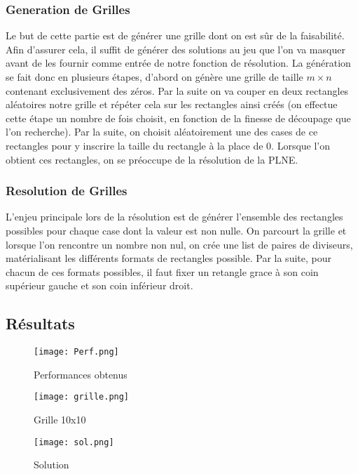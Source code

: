 \documentclass[a4paper,12pt,titlepage,leqno]{article}
\begin{document}
\subsubsection{Generation de Grilles}

Le but de cette partie est de générer une grille dont on est sûr de la faisabilité. Afin d'assurer cela, il suffit de générer des solutions au jeu que l'on va masquer avant de les fournir comme entrée de notre fonction de résolution.
La génération se fait donc en plusieurs étapes, d'abord on génère une grille de taille \( m \times n \) contenant exclusivement des zéros. Par la suite on va couper en deux rectangles aléatoires notre grille et répéter cela sur les rectangles ainsi créés (on effectue cette étape un nombre de fois choisit, en fonction de la finesse de découpage que l'on recherche). Par la suite, on choisit aléatoirement une des cases de ce rectangles pour y inscrire la taille du rectangle à la place de 0.
Lorsque l'on obtient ces rectangles, on se préoccupe de la résolution de la PLNE.

\subsubsection{Resolution de Grilles}

L'enjeu principale lors de la résolution est de générer l'ensemble des rectangles possibles pour chaque case dont la valeur est non nulle. On parcourt la grille et lorsque l'on rencontre un nombre non nul, on crée une list de paires de diviseurs, matérialisant les différents formats de rectangles possible. Par la suite, pour chacun de ces formats possibles, il faut fixer un retangle grace à son coin supérieur gauche et son coin inférieur droit.

\subsection{Résultats}

\begin{figure}[!ht]
\centering
\texttt{[image: Perf.png]}
\caption{Performances obtenus}
\end{figure}

\begin{figure}[h]
    \begin{minipage}[c]{.46\linewidth}
        \centering
        \texttt{[image: grille.png]}
        \caption{Grille 10x10}
    \end{minipage}
    \hfill%
    \begin{minipage}[c]{.46\linewidth}
        \centering
        \texttt{[image: sol.png]}
        \caption{Solution}
    \end{minipage}
\end{figure}
\end{document}
